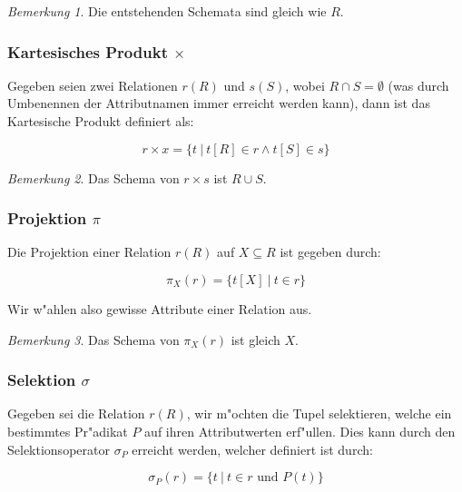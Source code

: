 \documentclass[german, 10pt, a4paper, twocolumn]{scrartcl}
\theoremstyle{definition}
\theoremstyle{remark}
\newtheorem*{remark}{Bemerkung}
\theoremstyle{example}
\begin{document}
\begin{remark}
	Die entstehenden Schemata sind gleich wie $R$.
\end{remark}


\subsubsection{Kartesisches Produkt $\times$}

Gegeben seien zwei Relationen $r(R)$ und $s(S)$, wobei $R\cap S = \emptyset$ (was durch Umbenennen der Attributnamen immer erreicht werden kann), dann ist das Kartesische Produkt definiert als:

\begin{displaymath}
	r\times x = \{ t \ | \ t[R] \in r \land t[S] \in s \}
\end{displaymath}

\begin{remark}
	Das Schema von $r\times s$ ist $R\cup S$.
\end{remark}

\subsubsection{Projektion $\pi$}

Die Projektion einer Relation $r(R)$ auf $X \subseteq R$ ist gegeben durch:

\begin{displaymath}
	\pi_X(r) = \{ t[X] \ | \ t \in r\}
\end{displaymath}

Wir w"ahlen also gewisse Attribute einer Relation aus.

\begin{remark}
	Das Schema von $\pi_X(r)$ ist gleich $X$.
\end{remark}


\subsubsection{Selektion $\sigma$}

Gegeben sei die Relation $r(R)$, wir m"ochten die Tupel selektieren, welche ein bestimmtes Pr"adikat $P$ auf ihren Attributwerten erf"ullen. Dies kann durch den Selektionsoperator $\sigma_P$ erreicht werden, welcher definiert ist durch:

\begin{displaymath}
	\sigma_P(r) = \{ t \ | \ t \in r \text{ und } P(t)\}
\end{displaymath}
\end{document}
